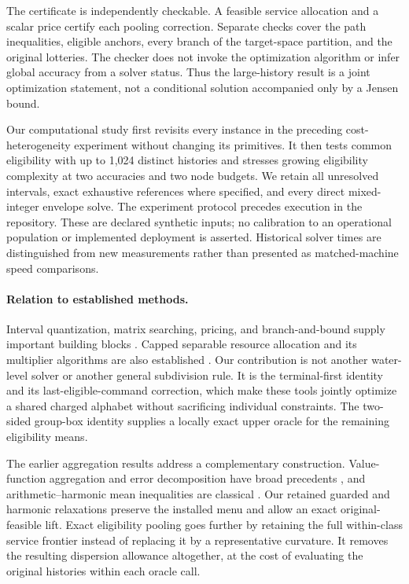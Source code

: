 The certificate is independently checkable. A feasible service allocation and a scalar price certify each pooling correction. Separate checks cover the path inequalities, eligible anchors, every branch of the target-space partition, and the original lotteries. The checker does not invoke the optimization algorithm or infer global accuracy from a solver status. Thus the large-history result is a joint optimization statement, not a conditional solution accompanied only by a Jensen bound.

Our computational study first revisits every instance in the preceding cost-heterogeneity experiment without changing its primitives. It then tests common eligibility with up to 1,024 distinct histories and stresses growing eligibility complexity at two accuracies and two node budgets. We retain all unresolved intervals, exact exhaustive references where specified, and every direct mixed-integer envelope solve. The experiment protocol precedes execution in the repository. These are declared synthetic inputs; no calibration to an operational population or implemented deployment is asserted. Historical solver times are distinguished from new measurements rather than presented as matched-machine speed comparisons.

\paragraph{Relation to established methods.}\label{sec:r37-position}
Interval quantization, matrix searching, pricing, and branch-and-bound supply important building blocks \citep{Wu1991,NielsenNock2014,GronlundEtAl2017,HandlerZang1980,LawlerWood1966,Lemarechal2001,HubnerEtAl2025}. Capped separable resource allocation and its multiplier algorithms are also established \citep{PatrikssonStromberg2015,SchootUiterkamp2022}. Our contribution is not another water-level solver or another general subdivision rule. It is the terminal-first identity and its last-eligible-command correction, which make these tools jointly optimize a shared charged alphabet without sacrificing individual constraints. The two-sided group-box identity supplies a locally exact upper oracle for the remaining eligibility means.

The earlier aggregation results address a complementary construction. Value-function aggregation and error decomposition have broad precedents \citep{LiBertsekas2025,Fattahi2025}, and arithmetic--harmonic mean inequalities are classical \citep{LiaoWu2015}. Our retained guarded and harmonic relaxations preserve the installed menu and allow an exact original-feasible lift. Exact eligibility pooling goes further by retaining the full within-class service frontier instead of replacing it by a representative curvature. It removes the resulting dispersion allowance altogether, at the cost of evaluating the original histories within each oracle call.

